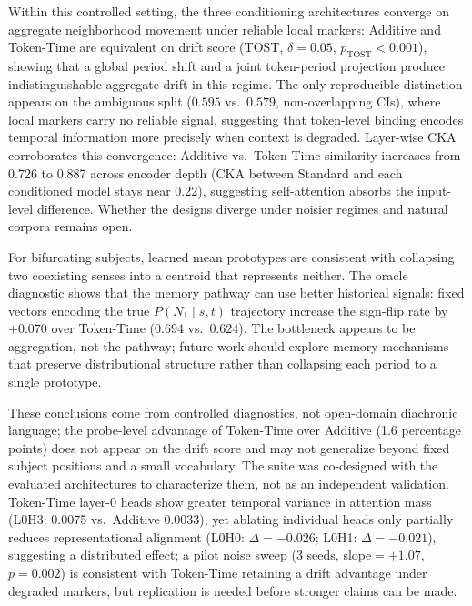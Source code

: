 \documentclass[runningheads]{llncs}
\begin{document}
Within this controlled setting, the three conditioning architectures converge
on aggregate neighborhood movement under reliable local markers: Additive and
Token-Time are equivalent on drift score (TOST, \(\delta=0.05\),
\(p_\mathrm{TOST}<0.001\)), showing that a global period shift and a joint
token-period projection produce indistinguishable aggregate drift in this regime.
The only reproducible distinction appears on the ambiguous split (\(0.595\)
vs.\ \(0.579\), non-overlapping CIs), where local markers carry no reliable signal,
suggesting that token-level binding encodes temporal information more precisely
when context is degraded. Layer-wise CKA corroborates this convergence:
Additive vs.\ Token-Time similarity increases from 0.726 to 0.887 across
encoder depth (CKA between Standard and each conditioned model stays near
0.22), suggesting self-attention absorbs the input-level difference. Whether the designs diverge under noisier regimes
and natural corpora remains open.

For bifurcating subjects, learned mean prototypes are consistent with collapsing two coexisting senses into a
centroid that represents neither. The oracle diagnostic shows that the memory pathway
can use better historical signals: fixed vectors encoding the true \(P(N_1 \mid s, t)\) trajectory
increase the sign-flip rate by \(+0.070\) over Token-Time (\(0.694\)
vs.\ \(0.624\)). The bottleneck appears to be aggregation, not the pathway; future work
should explore memory mechanisms that preserve distributional structure rather
than collapsing each period to a single prototype.

These conclusions come from controlled diagnostics, not open-domain diachronic
language; the probe-level advantage of Token-Time over Additive (1.6 percentage
points) does not appear on the drift score and may not generalize beyond fixed
subject positions and a small vocabulary. The suite was co-designed with the
evaluated architectures to characterize them, not as an independent validation.
Token-Time layer-0 heads show greater temporal variance in attention mass
(L0H3: 0.0075 vs.\ Additive 0.0033), yet ablating individual heads only
partially reduces representational alignment (L0H0: \(\Delta=-0.026\);
L0H1: \(\Delta=-0.021\)), suggesting a distributed effect; a pilot noise sweep
(3 seeds, slope\(=+1.07\), \(p=0.002\)) is consistent with Token-Time retaining
a drift advantage under degraded markers, but replication is needed before
stronger claims can be made.



\end{document}
